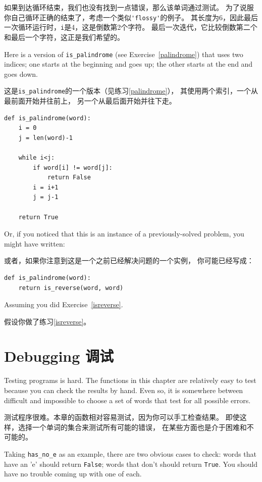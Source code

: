 \documentclass[10pt]{book}
\begin{document}
\begin{CJK}{UTF8}{gbsn}
如果到达循环结束，我们也没有找到一点错误，那么该单词通过测试。
为了说服你自己循环正确的结束了，考虑一个类似\verb"'flossy'"的例子。
其长度为6，因此最后一次循环运行时，{\tt i}是4，这是倒数第2个字符。
最后一次迭代，它比较倒数第二个和最后一个字符，这正是我们希望的。

Here is a version of \verb"is_palindrome" (see
Exercise~\ref{palindrome}) that uses two indices; one starts at the
beginning and goes up; the other starts at the end and goes down.

这是\verb"is_palindrome"的一个版本（见练习\ref{palindrome}），
其使用两个索引，一个从最前面开始并往前上，
另一个从最后面开始并往下走。

\begin{verbatim}
def is_palindrome(word):
    i = 0
    j = len(word)-1

    while i<j:
        if word[i] != word[j]:
            return False
        i = i+1
        j = j-1

    return True
\end{verbatim}

Or, if you noticed that this is an instance of a previously-solved
problem, you might have written:

或者，如果你注意到这是一个之前已经解决问题的一个实例，
你可能已经写成：

\begin{verbatim}
def is_palindrome(word):
    return is_reverse(word, word)
\end{verbatim}

Assuming you did Exercise~\ref{isreverse}.

假设你做了练习\ref{isreverse}。


\section{Debugging 调试}

Testing programs is hard.  The functions in this chapter are
relatively easy to test because you can check the results by hand.
Even so, it is somewhere between difficult and impossible to choose a
set of words that test for all possible errors.

测试程序很难。本章的函数相对容易测试，因为你可以手工检查结果。
即使这样，选择一个单词的集合来测试所有可能的错误，
在某些方面也是介于困难和不可能的。

Taking \verb"has_no_e" as an example, there are two obvious
cases to check: words that have an 'e' should return {\tt False};
words that don't should return {\tt True}.  You should have no
trouble coming up with one of each.


\end{CJK}
\end{document}
